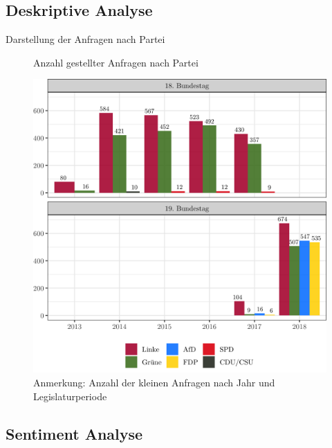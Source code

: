 \documentclass[]{article}
\begin{document}
\subsection{Deskriptive Analyse}\label{deskriptive-analyse}

Darstellung der Anfragen nach Partei

\begin{figure}[!h]
    \caption{Anzahl gestellter Anfragen nach Partei}
    \label{anfragen_count}
    \centering
    \includegraphics[width=\textwidth]{images/AnfragenPartei_18_19_complete.png}
    \caption*{\scriptsize Anmerkung: Anzahl der kleinen Anfragen nach Jahr und Legislaturperiode}
\end{figure}

\subsection{Sentiment Analyse}\label{sentiment-analyse}
\end{document}
